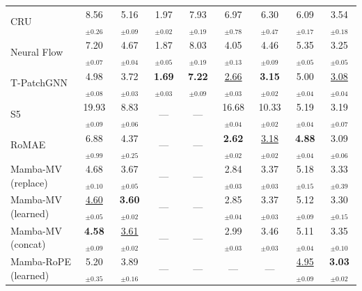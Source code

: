 \begin{table}[t]
\begin{tabular}{lcccccccc}
CRU          & 8.56$_{\pm 0.26}$ & 5.16$_{\pm 0.09}$ & 1.97$_{\pm 0.02}$ & 7.93$_{\pm 0.19}$ & 6.97$_{\pm 0.78}$ & 6.30$_{\pm 0.47}$ & 6.09$_{\pm 0.17}$ & 3.54$_{\pm 0.18}$ \\
Neural Flow  & 7.20$_{\pm 0.07}$ & 4.67$_{\pm 0.04}$ & 1.87$_{\pm 0.05}$ & 8.03$_{\pm 0.19}$ & 4.05$_{\pm 0.13}$ & 4.46$_{\pm 0.09}$ & 5.35$_{\pm 0.05}$ & 3.25$_{\pm 0.05}$ \\
T-PatchGNN   & 4.98$_{\pm 0.08}$ & 3.72$_{\pm 0.03}$ & \textbf{1.69$_{\pm 0.03}$} & \textbf{7.22$_{\pm 0.09}$} & \underline{2.66$_{\pm 0.03}$} & \textbf{3.15$_{\pm 0.02}$} & 5.00$_{\pm 0.04}$ & \underline{3.08$_{\pm 0.04}$} \\
\midrule
S5                & 19.93$_{\pm 0.09}$ & 8.83$_{\pm 0.06}$ & --- & --- & 16.68$_{\pm 0.04}$ & 10.33$_{\pm 0.02}$ & 5.19$_{\pm 0.04}$ & 3.19$_{\pm 0.07}$ \\
RoMAE             & 6.88$_{\pm 0.99}$ & 4.37$_{\pm 0.25}$ & --- & --- & \textbf{2.62$_{\pm 0.02}$} & \underline{3.18$_{\pm 0.02}$} & \textbf{4.88$_{\pm 0.04}$} & 3.09$_{\pm 0.06}$ \\
Mamba-MV (replace)& 4.68$_{\pm 0.10}$ & 3.67$_{\pm 0.05}$ & --- & --- & 2.84$_{\pm 0.03}$ & 3.37$_{\pm 0.03}$ & 5.18$_{\pm 0.15}$ & 3.33$_{\pm 0.39}$ \\
Mamba-MV (learned)& \underline{4.60$_{\pm 0.05}$} & \textbf{3.60$_{\pm 0.02}$} & --- & --- & 2.85$_{\pm 0.04}$ & 3.37$_{\pm 0.03}$ & 5.12$_{\pm 0.09}$ & 3.30$_{\pm 0.15}$ \\
Mamba-MV (concat) & \textbf{4.58$_{\pm 0.09}$} & \underline{3.61$_{\pm 0.02}$} & --- & --- & 2.99$_{\pm 0.03}$ & 3.46$_{\pm 0.03}$ & 5.11$_{\pm 0.04}$ & 3.35$_{\pm 0.10}$ \\
Mamba-RoPE (learned) & 5.20$_{\pm 0.35}$ & 3.89$_{\pm 0.16}$ & --- & --- & --- & --- & \underline{4.95$_{\pm 0.09}$} & \textbf{3.03$_{\pm 0.02}$} \\
\bottomrule
\end{tabular}
\end{table}
